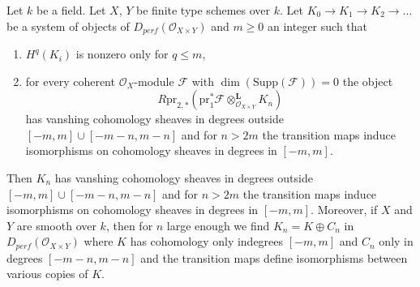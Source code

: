 \begin{lemma}
\label{lemma-bounded-fibres}
Let $k$ be a field. Let $X$, $Y$ be finite type schemes over $k$.
Let $K_0 \to K_1 \to K_2 \to \ldots$ be a system of objects
of $D_{perf}(\mathcal{O}_{X \times Y})$ and $m \geq 0$ an integer such that
\begin{enumerate}
\item $H^q(K_i)$ is nonzero only for $q \leq m$,
\item for every coherent $\mathcal{O}_X$-module $\mathcal{F}$ with
$\dim(\text{Supp}(\mathcal{F})) = 0$ the object
$$
R\text{pr}_{2, *}(
\text{pr}_1^*\mathcal{F} \otimes_{\mathcal{O}_{X \times Y}}^\mathbf{L}
K_n)
$$
has vanshing cohomology sheaves in degrees outside
$[-m, m] \cup [-m - n, m - n]$ and for $n > 2m$ the transition maps
induce isomorphisms on cohomology sheaves in degrees in $[-m, m]$.
\end{enumerate}
Then $K_n$ has vanshing cohomology sheaves in degrees outside
$[-m, m] \cup [-m - n, m - n]$ and for $n > 2m$ the
transition maps induce isomorphisms on cohomology sheaves in degrees in
$[-m, m]$. Moreover, if $X$ and $Y$ are smooth over $k$, then for $n$
large enough we find $K_n = K \oplus C_n$ in
$D_{perf}(\mathcal{O}_{X \times Y})$
where $K$ has cohomology only indegrees $[-m, m]$ and $C_n$ only in
degrees $[-m - n, m - n]$ and the transition maps
define isomorphisms between various copies of $K$.
\end{lemma}

